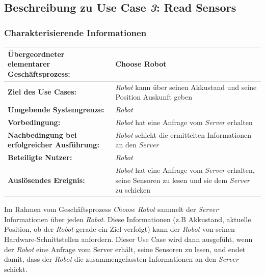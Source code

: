 			
		\pagebreak

		\subsection{Beschreibung zu Use Case \emph{3}: Read Sensors}

			\subsubsection*{Charakterisierende Informationen}

			\begin{table}[H]
				\centering
				\begin{tabularx}{\textwidth}{|p{5cm}|X|}
				\hline
				\textbf{Übergeordneter elementarer Geschäftsprozess:} & Choose Robot\\ \hline
				\textbf{Ziel des Use Cases:} & \emph{Robot} kann über seinen Akkustand und seine Position Auskunft geben\\ \hline
				\textbf{Umgebende Systemgrenze:} & \emph{Robot} \\ \hline
				\textbf{Vorbedingung:} & \emph{Robot} hat eine Anfrage vom \emph{Server} erhalten \\ \hline
				\textbf{Nachbedingung bei erfolgreicher Ausführung:} & \emph{Robot} schickt die ermittelten Informationen an den \emph{Server} \\ \hline
				\textbf{Beteiligte Nutzer:} & \emph{Robot} \\ \hline
				\textbf{Auslösendes Ereignis:} & \emph{Robot} hat eine Anfrage vom \emph{Server} erhalten, seine Sensoren zu lesen und sie dem \emph{Server} zu schicken \\
				\hline
				\end{tabularx}
			\end{table}

			Im Rahmen vom Geschäftsprozess \emph{Choose Robot} sammelt der \emph{Server}
			Informationen über jeden \emph{Robot}. Diese Informationen (z.B
			Akkustand, aktuelle Position, ob der \emph{Robot} gerade ein Ziel verfolgt)
			kann der \emph{Robot} von seinen Hardware-Schnittstellen anfordern. Dieser
			Use Case wird dann ausgefüht, wenn der \emph{Robot} eine Anfrage vom
			Server erhält, seine Sensoren zu lesen, und endet damit, dass der \emph{Robot}
			die zusammengefassten Informationen an den \emph{Server} schickt.

